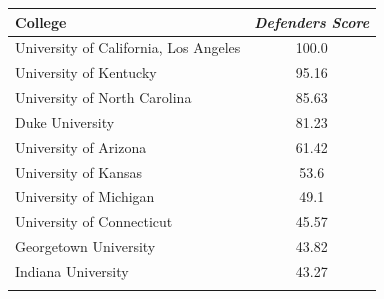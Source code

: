 \documentclass[10.5pt,a4paper,twocolumn]{article}
\begin{document}
\begin{table}[t]
\begin{tabular}{lc}
	\end{tabular}
	
	\begin{tabular}{lc}
		College & \textit{Defenders Score}  \\
		\hline
		University of California, Los Angeles & 100.0\\
		University of Kentucky & 95.16\\
		University of North Carolina & 85.63\\
		Duke University & 81.23\\
		University of Arizona & 61.42\\
		University of Kansas & 53.6\\
		University of Michigan & 49.1\\
		University of Connecticut & 45.57\\
		Georgetown University & 43.82\\
		Indiana University & 43.27\\
		&\\
		
	\end{tabular}
	
\end{table}
\end{document}
